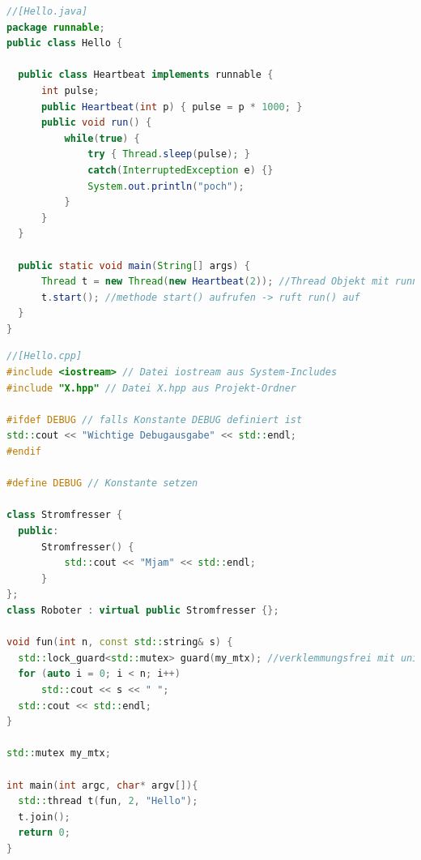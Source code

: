 \documentclass[10pt]{article}
\begin{document}
\begin{lstlisting}[language=java]
//[Hello.java]
package runnable;
public class Hello {

  public class Heartbeat implements runnable {
      int pulse;
      public Heartbeat(int p) { pulse = p * 1000; }
      public void run() {
          while(true) {
              try { Thread.sleep(pulse); }
              catch(InterruptedException e) {}
              System.out.println("poch");
          }
      }
  }

  public static void main(String[] args) {
      Thread t = new Thread(new Heartbeat(2)); //Thread Objekt mit runnable erzeugen
      t.start(); //methode start() aufrufen -> ruft run() auf
  }
}
\end{lstlisting}
\hfill
\begin{lstlisting}[language=C++]
//[Hello.cpp]
#include <iostream> // Datei iostream aus System-Includes
#include "X.hpp" // Datei X.hpp aus Projekt-Ordner

#ifdef DEBUG // falls Konstante DEBUG definiert ist
std::cout << "Wichtige Debugausgabe" << std::endl;
#endif

#define DEBUG // Konstante setzen

class Stromfresser {
  public:
      Stromfresser() {
          std::cout << "Mjam" << std::endl;
      }
};
class Roboter : virtual public Stromfresser {};

void fun(int n, const std::string& s) {
  std::lock_guard<std::mutex> guard(my_mtx); //verklemmungsfrei mit unique_lock<std::mutex>
  for (auto i = 0; i < n; i++)
      std::cout << s << " ";
  std::cout << std::endl;
}

std::mutex my_mtx;

int main(int argc, char* argv[]){
  std::thread t(fun, 2, "Hello");
  t.join();
  return 0;
}
\end{lstlisting}
\hfill
\end{document}
